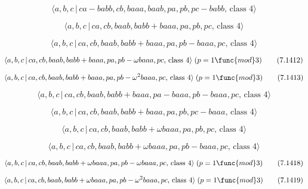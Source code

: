 \documentclass[10pt]{article}
\begin{document}
\begin{equation}
\langle a,b,c\,|\,ca-babb,cb,baaa,baab,pa,pb,pc-babb,\,\text{class }4\rangle
\tag{7.1409}
\end{equation}

\begin{equation}
\langle a,b,c\,|\,ca,cb,baab,babb+baaa,pa,pb,pc,\,\text{class }4\rangle 
\tag{7.1410}
\end{equation}

\begin{equation}
\langle a,b,c\,|\,ca,cb,baab,babb+baaa,pa,pb-baaa,pc,\,\text{class }4\rangle
\tag{7.1411}
\end{equation}

\begin{equation}
\langle a,b,c\,|\,ca,cb,baab,babb+baaa,pa,pb-\omega baaa,pc,\,\text{class }%
4\rangle \;(p=1\func{mod}3)  \tag{7.1412}
\end{equation}

\begin{equation}
\langle a,b,c\,|\,ca,cb,baab,babb+baaa,pa,pb-\omega ^{2}baaa,pc,\,\text{%
class }4\rangle \;(p=1\func{mod}3)  \tag{7.1413}
\end{equation}

\begin{equation}
\langle a,b,c\,|\,ca,cb,baab,babb+baaa,pa-baaa,pb-baaa,pc,\,\text{class }%
4\rangle  \tag{7.1414}
\end{equation}

\begin{equation}
\langle a,b,c\,|\,ca,cb,baab,babb+baaa,pa,pb,pc-baaa,\,\text{class }4\rangle
\tag{7.1415}
\end{equation}

\begin{equation}
\langle a,b,c\,|\,ca,cb,baab,babb+\omega baaa,pa,pb,pc,\,\text{class }%
4\rangle  \tag{7.1416}
\end{equation}

\begin{equation}
\langle a,b,c\,|\,ca,cb,baab,babb+\omega baaa,pa,pb-baaa,pc,\,\text{class }%
4\rangle  \tag{7.1417}
\end{equation}

\begin{equation}
\langle a,b,c\,|\,ca,cb,baab,babb+\omega baaa,pa,pb-\omega baaa,pc,\,\text{%
class }4\rangle \;(p=1\func{mod}3)  \tag{7.1418}
\end{equation}

\begin{equation}
\langle a,b,c\,|\,ca,cb,baab,babb+\omega baaa,pa,pb-\omega ^{2}baaa,pc,\,%
\text{class }4\rangle \;(p=1\func{mod}3)  \tag{7.1419}
\end{equation}
\end{document}
